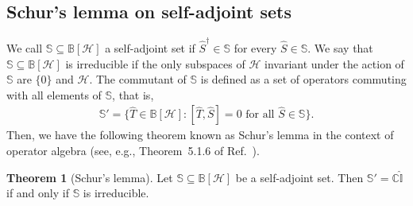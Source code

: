 \documentclass[preprint,pteplogo]{ptephy_v2}%
\numberwithin{equation}{section}
\theoremstyle{definition}
\newtheorem{theorem}{Theorem}
\newcommand{\mc}[1]{\mathcal{#1}}
\newcommand{\mbb}[1]{\mathbb{#1}}
\begin{document}
\subsection{Schur's lemma on self-adjoint sets}
\label{app:SchurLemma}

We call $\mbb{S} \subseteq \mbb{B}[\mc{H}]$ a self-adjoint set if $\hat{S}^\dagger \in \mbb{S}$ for every $\hat{S} \in \mbb{S}$.
We say that $\mbb{S} \subseteq \mbb{B}[\mc{H}]$ is irreducible if the only subspaces of $\mc{H}$ invariant under the action of $\mbb{S}$ are $\{0\}$ and $\mc{H}$.
The commutant of $\mbb{S}$ is defined as a set of operators commuting with all elements of $\mbb{S}$, that is, 
\begin{align}
\mbb{S}' = \{ \hat{T} \in \mbb{B}[\mc{H}] : [\hat{T}, \hat{S}] = 0 \textrm{ for all } \hat{S} \in \mbb{S} \}.
\end{align}
Then, we have the following theorem known as Schur's lemma in the context of operator algebra (see, e.g., Theorem~5.1.6 of Ref.~\cite{deitmar2014harmonic}).

\begin{theorem}[Schur's lemma]
Let $\mbb{S} \subseteq \mbb{B}[\mc{H}]$ be a self-adjoint set. 
Then $\mbb{S}' = \mbb{C} \hat{\mbb{I}}$ if and only if $\mbb{S}$ is irreducible.
\end{theorem}
\end{document}
